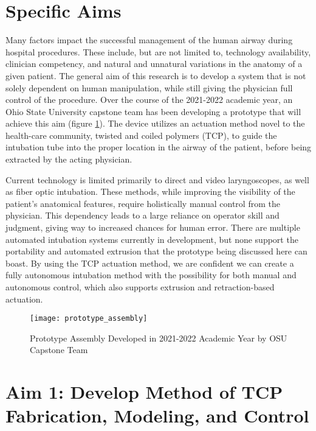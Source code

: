 \section*{Specific Aims}
\label{parts:specific_aims}

Many factors impact the successful management of the human airway during hospital procedures. These include, but are not limited to, technology availability, clinician competency, and natural and unnatural variations in the anatomy of a given patient. The general aim of this research is to develop a system that is not solely dependent on human manipulation, while still giving the physician full control of the procedure. Over the course of the 2021-2022 academic year, an Ohio State University capstone team has been developing a prototype that will achieve this aim (figure \ref{fig:prototype_assembly}). The device utilizes an actuation method novel to the health-care community, twisted and coiled polymers (TCP), to guide the intubation tube into the proper location in the airway of the patient, before being extracted by the acting physician.

Current technology is limited primarily to direct and video laryngoscopes, as well as fiber optic intubation. These methods, while improving the visibility of the patient's anatomical features, require holistically manual control from the physician. This dependency leads to a large reliance on operator skill and judgment, giving way to increased chances for human error. There are multiple automated intubation systems currently in development, but none support the portability and automated extrusion that the prototype being discussed here can boast. By using the TCP actuation method, we are confident we can create a fully autonomous intubation method with the possibility for both manual and autonomous control, which also supports extrusion and retraction-based actuation.

\begin{figure}[ht]
	\centering
	\texttt{[image: prototype\_assembly]}
	\caption{Prototype Assembly Developed in 2021-2022 Academic Year by OSU Capstone Team}
	\label{fig:prototype_assembly}
\end{figure}

	\section{Aim 1: Develop Method of TCP Fabrication, Modeling, and Control}
	\label{subsect:aim1}
	
